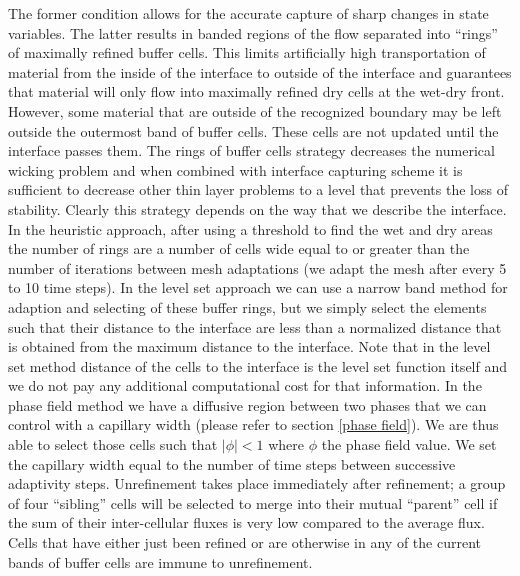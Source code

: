 \documentclass[review]{elsarticle}
\begin{document}
The former condition allows for the accurate capture of sharp changes in state variables. The latter results in banded regions of the flow separated into ``rings'' of maximally refined buffer cells.  
This limits artificially high transportation of material from the inside of the interface to outside of the interface and guarantees that material will only flow into maximally refined dry 
cells at the wet-dry front.
However, some material that are outside of the recognized boundary may be left outside the outermost band of buffer cells. These cells are not updated until the interface passes them.
The rings of buffer cells strategy decreases the numerical wicking problem and when combined with interface capturing scheme it is sufficient to decrease other thin layer problems to a level that 
prevents the loss of stability.
Clearly this strategy depends on the way that we describe the interface. In the heuristic approach, after using a threshold to find the wet and dry areas the number of rings are a number of cells wide 
equal to or greater than the number of iterations between mesh adaptations (we adapt the mesh after every 5 to 10 time steps). In the level set approach we can use a narrow band method for adaption 
and selecting of these buffer rings, but we simply select the elements such that their distance to the interface are less than a normalized distance that is obtained from the maximum distance 
to the interface. Note that in the level set method distance of the cells to the interface is the level set function itself and we do not pay any additional computational cost for that information. 
In the phase field method we have a diffusive region between two phases that we can control with a capillary width (please refer to section \ref{phase field}).
We are thus able to select those cells such that $|\phi| <1 $ where $\phi$ the phase field value. We set the capillary width equal to the number of time steps between successive adaptivity steps.
Unrefinement takes place immediately after refinement; a group of four ``sibling'' cells will be selected to merge into their mutual ``parent'' cell if the sum of their inter-cellular fluxes is very 
low compared to the average flux.  Cells that have either just been refined or are otherwise in any of the current bands of buffer cells are immune 
to unrefinement.  
    
\end{document}
